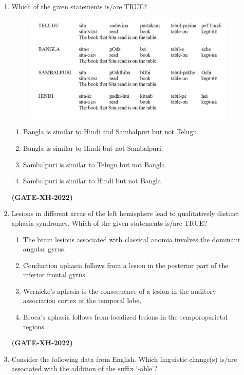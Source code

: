 \documentclass[journal]{IEEEtran}
\begin{document}
\begin{enumerate}
\item Which of the given statements is/are TRUE? 
\begin{figure}[h!]
    \centering
    \includegraphics[width=0.9\columnwidth]{figs/Q.132.jpeg}
    \label{Q.132}
\end{figure}
\begin{enumerate}
\item Bangla is similar to Hindi and Sambalpuri but not Telugu.  
\item Bangla is similar to Hindi but not Sambalpuri.  
\item Sambalpuri is similar to Telugu but not Bangla.  
\item Sambalpuri is similar to Hindi but not Bangla.  
\end{enumerate}
\hfill\textbf{(GATE-XH-2022)}

\item Lesions in different areas of the left hemisphere lead to qualitatively distinct aphasia syndromes. Which of the given statements is/are TRUE?  
\begin{enumerate}
\item The brain lesions associated with classical anomia involves the dominant angular gyrus.  
\item Conduction aphasia follows from a lesion in the posterior part of the inferior frontal gyrus.  
\item Wernicke’s aphasia is the consequence of a lesion in the auditory association cortex of the temporal lobe.  
\item Broca’s aphasia follows from localized lesions in the temporoparietal regions.  
\end{enumerate}
\hfill\textbf{(GATE-XH-2022)}

\item Consider the following data from English. Which linguistic change(s) is/are associated with the addition of the suffix ‘-able’?  


\end{enumerate}
\end{document}
